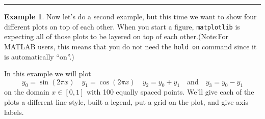 \documentclass[
]{book}
\theoremstyle{definition}
\theoremstyle{definition}
\newtheorem{example}{Example}[chapter]
\theoremstyle{definition}
\theoremstyle{remark}
\begin{document}
\begin{center}\rule{0.5\linewidth}{0.5pt}\end{center}

\begin{example}
\protect\hypertarget{exm:unnamed-chunk-755}{}{\label{exm:unnamed-chunk-755} }Now let's do a second example, but this time we want to show four different plots on top of each other. When you start a figure, \texttt{matplotlib} is expecting all of those plots to be layered on top of each other.(Note:For MATLAB users, this means that you do not need the \texttt{hold\ on} command since it is automatically ``on''.)

In this example we will plot
\[y_0 = \sin(2\pi x) \quad y_1 = \cos(2 \pi x) \quad y_2 = y_0 + y_1 \quad \text{and} \quad y_3 = y_0 - y_1\]
on the domain \(x \in [0,1]\) with 100 equally spaced points. We'll give each of the plots a different line style, built a legend, put a grid on the plot, and give axis labels.
\end{example}
\end{document}
